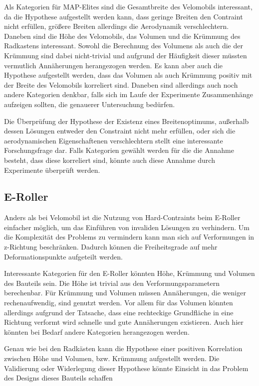 \documentclass[12pt]{article}
\begin{document}
Als Kategorien für MAP-Elites sind die Gesamtbreite des Velomobils interessant, da die Hypothese aufgestellt werden kann, dass geringe Breiten den Contraint nicht erfüllen, größere Breiten allerdings die Aerodynamik verschlechtern.
Daneben sind die Höhe des Velomobils, das Volumen und die Krümmung des Radkastens interessant.
Sowohl die Berechnung des Volumens als auch die der Krümmung sind dabei nicht-trivial und aufgrund der Häufigkeit dieser müssten vermutlich Annäherungen herangezogen werden.
Es kann aber auch die Hypothese aufgestellt werden, dass das Volumen als auch Krümmung positiv mit der Breite des Velomobils korreliert sind.
Daneben sind allerdings auch noch andere Kategorien denkbar, falls sich im Laufe der Experimente Zusammenhänge aufzeigen sollten, die genauerer Untersuchung bedürfen.

Die Überprüfung der Hypothese der Existenz eines Breitenoptimums, außerhalb dessen Lösungen entweder den Constraint nicht mehr erfüllen, oder sich die aerodynamischen Eigenschaftenen verschlechtern stellt eine interessante Forschungsfrage dar.
Falls Kategorien gewählt werden für die die Annahme besteht, dass diese korreliert sind, könnte auch diese Annahme durch Experimente überprüft werden.

\subsection{E-Roller}
Anders als bei Velomobil ist die Nutzung von Hard-Contraints beim E-Roller einfacher möglich, um das Einführen von invaliden Lösungen zu verhindern.
Um die Komplexität des Problems zu vermindern kann man sich auf Verformungen in z-Richtung beschränken.
Dadurch können die Freiheitsgrade auf mehr Deformationspunkte aufgeteilt werden.

Interessante Kategorien für den E-Roller könnten Höhe, Krümmung und Volumen des Bauteils sein.
Die Höhe ist trivial aus den Verformungsparametern berechenbar.
Für Krümmung und Volumen müssen Annäherungen, die weniger rechenaufwendig, sind genutzt werden.
Vor allem für das Volumen könnten allerdings aufgrund der Tatsache, dass eine rechteckige Grundfläche in eine Richtung verformt wird schnelle und gute Annäherungen existieren.
Auch hier könnten bei Bedarf andere Kategorien herangezogen werden.

Genau wie bei den Radkästen kann die Hypothese einer positiven Korrelation zwischen Höhe und Volumen, bzw. Krümmung aufgestellt werden.
Die Validierung oder Widerlegung dieser Hypothese könnte Einsicht in das Problem des Designs dieses Bauteils schaffen
\end{document}
